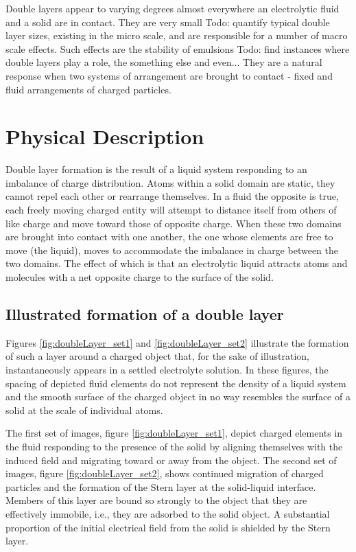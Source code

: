 Double layers appear to varying degrees almost everywhere an electrolytic fluid and a solid are in contact. They are very small {Todo: quantify typical double layer sizes}, existing in the micro scale, and are responsible for a number of macro scale effects. Such effects are the stability of emulsions {Todo: find instances where double layers play a role}, the something else and even... They are a natural response when two systems of arrangement are brought to contact - fixed and fluid arrangements of charged particles.

\section{Physical Description}
    Double layer formation is the result of a liquid system responding to an imbalance of charge distribution. Atoms within a solid domain are static, they cannot repel each other or rearrange themselves. In a fluid the opposite is true, each freely moving charged entity will attempt to distance itself from others of like charge and move toward those of opposite charge. When these two domains are brought into contact with one another, the one whose elements are free to move (the liquid), moves to accommodate the imbalance in charge between the two domains. The effect of which is that an electrolytic liquid attracts atoms and molecules with a net opposite charge to the surface of the solid.

\subsection{Illustrated formation of a double layer}
    Figures \ref{fig:doubleLayer_set1} and \ref{fig:doubleLayer_set2} illustrate the formation of such a layer around a charged object that, for the sake of illustration, instantaneously appears in a settled electrolyte solution. In these figures, the spacing of depicted fluid elements do not represent the density of a liquid system and the smooth surface of the charged object in no way resembles the surface of a solid at the scale of individual atoms.

    The first set of images, figure \ref{fig:doubleLayer_set1}, depict charged elements in the fluid responding to the presence of the solid by aligning themselves with the induced field and migrating toward or away from the object. The second set of images, figure \ref{fig:doubleLayer_set2}, shows continued migration of charged particles and the formation of the Stern layer at the solid-liquid interface. Members of this layer are bound so strongly to the object that they are effectively immobile, i.e., they are adsorbed to the solid object. A substantial proportion of the initial electrical field from the solid is shielded by the Stern layer.

